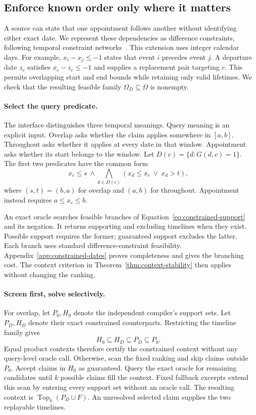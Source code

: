 \subsection{Enforce known order only where it matters}
\label{sec:constrained}
A source can state that one appointment follows another without identifying either exact date.
We represent these dependencies as difference constraints, following temporal constraint networks~\citep{dechter1991temporal}.
This extension uses integer calendar days.
For example, $x_i-x_j\leq-1$ states that event $i$ precedes event $j$.
A departure date $z_c$ satisfies $x_c-z_c\leq-1$ and supplies a replacement pair targeting $c$.
This permits overlapping start and end bounds while retaining only valid lifetimes.
We check that the resulting feasible family $\Omega_D\subseteq\Omega$ is nonempty.

\paragraph{Select the query predicate.}
The interface distinguishes three temporal meanings.
Query meaning is an explicit input.
Overlap asks whether the claim applies somewhere in $[a,b]$.
Throughout asks whether it applies at every date in that window.
Appointment asks whether its start belongs to the window.
Let $D(c)=\{d:G(d,c)=1\}$.
The first two predicates have the common form
\begin{equation}
 x_c\leq s\ \land\!\bigwedge_{d\in D(c)}
 (x_d\leq x_c\ \lor\ x_d>t),
 \label{eq:constrained-support}
\end{equation}
where $(s,t)=(b,a)$ for overlap and $(a,b)$ for throughout.
Appointment instead requires $a\leq x_c\leq b$.

An exact oracle searches feasible branches of Equation~\ref{eq:constrained-support} and its negation.
It returns supporting and excluding timelines when they exist.
Possible support requires the former; guaranteed support excludes the latter.
Each branch uses standard difference-constraint feasibility.
Appendix~\ref{app:constrained-dates} proves completeness and gives the branching cost.
The context criterion in Theorem~\ref{thm:context-stability} then applies without changing the ranking.

\paragraph{Screen first, solve selectively.}
For overlap, let $P_0,H_0$ denote the independent compiler's support sets.
Let $P_D,H_D$ denote their exact constrained counterparts.
Restricting the timeline family gives
\begin{equation}
 H_0\subseteq H_D\subseteq P_D\subseteq P_0.
\end{equation}
Equal product contexts therefore certify the constrained context without any query-level oracle call.
Otherwise, scan the fixed ranking and skip claims outside $P_0$.
Accept claims in $H_0$ as guaranteed.
Query the exact oracle for remaining candidates until $k$ possible claims fill the context.
Fixed fallback excerpts extend this scan by entering every support set without an oracle call.
The resulting context is $\operatorname{Top}_k(P_D\cup F)$.
An unresolved selected claim supplies the two replayable timelines.
